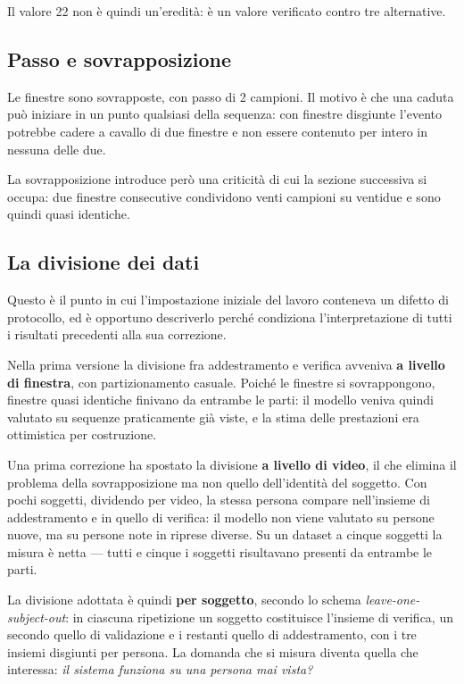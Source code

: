 Il valore 22 non è quindi un'eredità: è un valore verificato contro tre
alternative.

\subsection{Passo e sovrapposizione}

Le finestre sono sovrapposte, con passo di 2 campioni. Il motivo è che una
caduta può iniziare in un punto qualsiasi della sequenza: con finestre disgiunte
l'evento potrebbe cadere a cavallo di due finestre e non essere contenuto per
intero in nessuna delle due.

La sovrapposizione introduce però una criticità di cui la sezione successiva si
occupa: due finestre consecutive condividono venti campioni su ventidue e sono
quindi quasi identiche.

\subsection{La divisione dei dati}

Questo è il punto in cui l'impostazione iniziale del lavoro conteneva un difetto
di protocollo, ed è opportuno descriverlo perché condiziona
l'interpretazione di tutti i risultati precedenti alla sua correzione.

Nella prima versione la divisione fra addestramento e verifica avveniva
\textbf{a livello di finestra}, con partizionamento casuale. Poiché le finestre
si sovrappongono, finestre quasi identiche finivano da entrambe le parti: il
modello veniva quindi valutato su sequenze praticamente già viste, e la stima
delle prestazioni era ottimistica per costruzione.

Una prima correzione ha spostato la divisione \textbf{a livello di video}, il
che elimina il problema della sovrapposizione ma non quello dell'identità del
soggetto. Con pochi soggetti, dividendo per video, la stessa persona compare
nell'insieme di addestramento e in quello di verifica: il modello non viene
valutato su persone nuove, ma su persone note in riprese diverse. Su un dataset
a cinque soggetti la misura è netta — tutti e cinque i soggetti risultavano
presenti da entrambe le parti.

La divisione adottata è quindi \textbf{per soggetto}, secondo lo schema
\emph{leave-one-subject-out}: in ciascuna ripetizione un soggetto costituisce
l'insieme di verifica, un secondo quello di validazione e i restanti quello di
addestramento, con i tre insiemi disgiunti per persona. La domanda che si
misura diventa quella che interessa: \emph{il sistema funziona su una persona
mai vista?}

